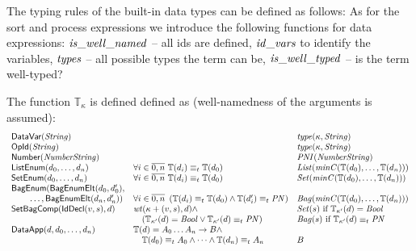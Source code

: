 \documentclass[fleqn,a4paper,dvips]{article}
\newcommand{\aterm}[1]{\mathsf{#1}}
\newcommand{\type}{\mathbb{T}}
\newcommand{\PNI}{\nm{PNI}}
\newcommand{\PN}{\nm{PN}}
\newcommand{\List}{\nm{List}}
\newcommand{\Set}{\nm{Set}}
\newcommand{\Bag}{\nm{Bag}}
\newcommand{\typecompat}{\equiv_t}
\newcommand{\wt}{\nm{wt}}
\begin{document}
The typing rules of the built-in data types can be defined as follows:
As for the sort and process expressions we introduce the following functions for data
expressions: $\mathit{is\_well\_named}$ -- all ids are defined, $\mathit{id\_vars}$ to identify
the variables, $\mathit{types}$ -- all possible types the term can be,
$\mathit{is\_well\_typed}$ -- is the term well-typed?

The function $\type_\kappa$ is defined defined as (well-namedness of the arguments is assumed):
\begin{displaymath}
\begin{array}{lll}
\aterm{DataVar}(\nm{String})         &                                                            & \nm{type}(\kappa,\nm{String})\\
\aterm{OpId}(\nm{String})            &                                                            & \nm{type}(\kappa,\nm{String})\\
\aterm{Number}(\nm{NumberString})    &                                                            & \PNI(\nm{NumberString})\\
\aterm{ListEnum}(d_0,\dots, d_n)     & \forall i\in\overline{0,n}~\type(d_i)\typecompat\type(d_0) & \List(\nm{minC}(\type(d_0),\dots,\type(d_n)))\\
\aterm{SetEnum}(d_0,\dots, d_n)      & \forall i\in\overline{0,n}~\type(d_i)\typecompat\type(d_0) & \Set(\nm{minC}(\type(d_0),\dots,\type(d_n)))\\
\aterm{BagEnum}(\aterm{BagEnumElt}(d_0,d_0'),\\
\t2\dots,\aterm{BagEnumElt}(d_n,d_n'))
                                     & \forall i\in\overline{0,n}~\left(\type(d_i)\typecompat\type(d_0)\land\type(d_i')\typecompat\PN\right)
                                                                                                  & \Bag(\nm{minC}(\type(d_0),\dots,\type(d_n)))\\
\aterm{SetBagComp}(\aterm{IdDecl}(v,s),d)
                                     & \wt(\kappa+(v,s),d)\land                                   & \Set(s)~\text{if}~\type_{\kappa'}(d)=\Bool \\
                                     &\t1(\type_{\kappa'}(d)=\Bool\lor\type_{\kappa'}(d)\typecompat\PN)               & \Bag(s)~\text{if}~\type_{\kappa'}(d)\typecompat\PN\\
\aterm{DataApp}(d, d_0,\dots,d_n)    & \type(d)=A_0 \dots A_n\to B\land\\
                                     & \t1\type(d_0)\typecompat A_0\land\dots\land\type(d_n)\typecompat A_n & B\\

\end{array}
\end{displaymath}
\end{document}
